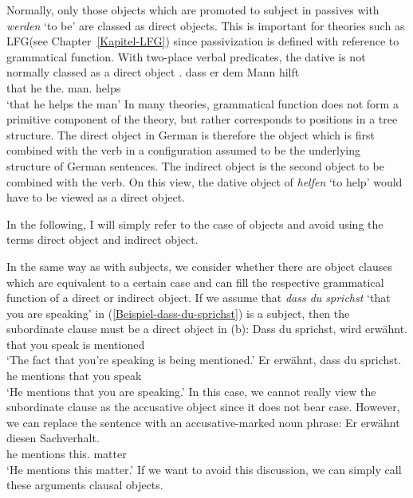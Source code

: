 Normally, only those objects which are promoted to subject in passives with \emph{werden} `to be' are classed as
direct objects. This is important for theories such as LFG\indexlfg (see Chapter~\ref{Kapitel-LFG}) since
passivization is defined with reference to grammatical function. With two-place verbal predicates, the dative 
is not normally classed as a direct object \citep{Cook2006a-u}. 
\ea
\gll dass er dem Mann hilft\\
     that he the.\dat{} man.\dat{} helps\\
\glt `that he helps the man'
\z
In many theories, grammatical function does not form a primitive component of the theory, but rather corresponds to positions
in a tree structure. The direct object in German is therefore the object which is first combined
with the verb in a configuration assumed to be the underlying structure of German sentences. The
indirect object is the second object to be combined with the verb. On this view, the dative object of \emph{helfen} `to help'
would have to be viewed as a direct object.

In the following, I will simply refer to the case of objects and avoid using the terms direct object and indirect object.

In the same way as with subjects, we consider whether there are object clauses which are
equivalent to a certain case and can fill the respective grammatical function of a direct or indirect object. If we assume that 
\emph{dass du sprichst} `that you are speaking' in (\ref{Beispiel-dass-du-sprichst}) is a subject,
then the subordinate clause must be a direct object in (b):
\eal
\ex\label{Beispiel-dass-du-sprichst} 
\gll Dass du sprichst, wird erwähnt.\\
     that you speak is mentioned\\
\glt `The fact that you're speaking is being mentioned.'
\ex
\gll Er erwähnt, dass du sprichst.\\
	 he mentions that you speak\\
\glt `He mentions that you are speaking.'
\zl
In this case, we cannot really view the subordinate clause as the accusative object since it does not bear case. However, we can replace the sentence with an accusative-marked
noun phrase:
\ea
\gll Er erwähnt diesen Sachverhalt.\\
	 he mentions this.\acc{} matter\\
\glt `He mentions this matter.'
\z
If we want to avoid this discussion, we can simply call these arguments clausal objects.


